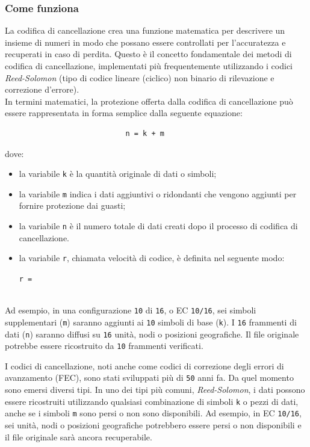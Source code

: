 \subsubsection{Come funziona}
La codifica di cancellazione crea una funzione matematica per descrivere un insieme di numeri in modo che possano essere controllati per l'accuratezza e recuperati in caso di perdita. Questo \`{e} il concetto fondamentale dei metodi di codifica di cancellazione, implementati pi\`{u} frequentemente utilizzando i codici \textit{Reed-Solomon} (tipo di codice lineare (ciclico) non binario di rilevazione e correzione d'errore).\cite{etichetta11}\\
In termini matematici, la protezione offerta dalla codifica di cancellazione pu\`{o} essere rappresentata in forma semplice dalla seguente equazione:  
\begin{verbatim}
                       		n = k + m
\end{verbatim}
dove:
\begin{itemize}
\item 
la variabile \verb"k" \`{e} la quantit\`{a} originale di dati o simboli; 
\item
la variabile \verb"m" indica i dati aggiuntivi o ridondanti che vengono aggiunti per fornire protezione dai guasti;
\item
la variabile \verb"n" \`{e} il numero totale di dati creati dopo il processo di codifica di cancellazione.\cite{etichetta11}
\item
la variabile \verb"r", chiamata velocit\`{a} di codice, \`{e} definita nel seguente modo: \\
\begin{center}
						\verb"r = "\\

\end{center}                       		
\end{itemize}
\\
Ad esempio, in una configurazione \verb"10" di \verb"16", o EC \verb"10/16", sei simboli supplementari (\verb"m") saranno aggiunti ai \verb"10" simboli di base (\verb"k"). I \verb"16" frammenti di dati (\verb"n") saranno diffusi su \verb"16" unit\`{a}, nodi o posizioni geografiche. Il file originale potrebbe essere ricostruito da \verb"10" frammenti verificati.\cite{etichetta11}

I codici di cancellazione, noti anche come codici di correzione degli errori di avanzamento (FEC), sono stati sviluppati pi\`{u} di \verb"50" anni fa. Da quel momento sono emersi diversi tipi. In uno dei tipi pi\`{u} comuni, \textit{Reed-Solomon}, i dati possono essere ricostruiti utilizzando qualsiasi combinazione di simboli \verb"k" o pezzi di dati, anche se i simboli \verb"m" sono persi o non sono disponibili. Ad esempio, in EC \verb"10/16", sei unit\`{a}, nodi o posizioni geografiche potrebbero essere persi o non disponibili e il file originale sar\`{a} ancora recuperabile.\cite{etichetta11}
 
